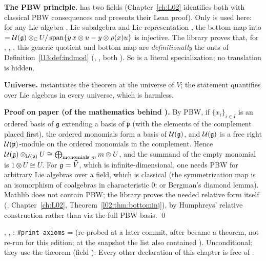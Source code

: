 \begin{dictionary}
\textbf{The PBW principle.}  has two fields (Chapter~\ref{ch:L02} identifies both with classical PBW
consequences and presents their Lean proof). Only  is used here: for any Lie algebra , Lie subalgebra  and Lie
representation , the bottom map into
 $=\mathcal{U}(\mathfrak g)\otimes_{\mathbb{C}} U/\operatorname{span}\{y\,x\otimes u - y\otimes\rho(x)u\}$
is injective. The library proves that, for , , , this
generic quotient and bottom map are \emph{definitionally} the ones of Definition~\ref{l13:def:indmod}
(, , both ). So  is a
literal specialization; no translation is hidden.

\textbf{Universe.}  instantiates the theorem at the universe of $V$; the statement quantifies over Lie
algebras in every universe, which is harmless.
\end{dictionary}

\textbf{Proof on paper (of the mathematics behind ).} By PBW, if $\{x_i\}_{i\in I}$ is an ordered basis of
$\mathfrak g$ extending a basis of $\mathfrak p$ (with the elements of the complement placed first), the ordered monomials form a
basis of $\mathcal{U}(\mathfrak g)$, and $\mathcal{U}(\mathfrak g)$ is a free right $\mathcal{U}(\mathfrak p)$-module on the
ordered monomials in the complement. Hence $\mathcal{U}(\mathfrak g)\otimes_{\mathcal{U}(\mathfrak p)}U\cong
\bigoplus_{\text{monomials }m}m\otimes U$, and the summand of the empty monomial is $1\otimes U\cong U$. For
$\mathfrak g = \widehat{V}$, which is infinite-dimensional, one needs PBW for arbitrary Lie algebras over a field, which is
classical (the symmetrization map is an isomorphism of coalgebras in characteristic $0$; or Bergman's diamond lemma). Mathlib
does not contain PBW; the library proves the needed relative form itself (,
Chapter~\ref{ch:L02}, Theorem~\ref{l02:thm:bottominj}), by Humphreys' relative construction rather than via the full PBW
basis. \qed

\begin{status}
, , : \texttt{\#print axioms} =
 (re-probed at a later commit, after  became a theorem, not re-run for this edition; at the snapshot the list also contained
). Unconditional; they use the theorem  (field ). Every other declaration of
this chapter is free of .
\end{status}

